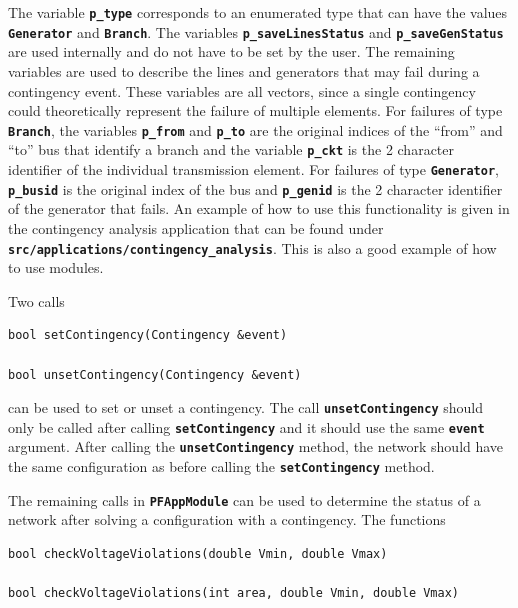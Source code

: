 \documentclass[12pt]{report} %
\begin{document}
The variable \texttt{\textbf{p\_type}} corresponds to an enumerated type that can have the values \texttt{\textbf{Generator}} and \texttt{\textbf{Branch}}. The variables \texttt{\textbf{p\_saveLinesStatus}} and \texttt{\textbf{p\_saveGenStatus}} are used internally and do not have to be set by the user. The remaining variables are used to describe the lines and generators that may fail during a contingency event. These variables are all vectors, since a single contingency could theoretically represent the failure of multiple elements. For failures of type \texttt{\textbf{Branch}}, the variables \texttt{\textbf{p\_from}} and \texttt{\textbf{p\_to}} are the original indices of the ``from'' and ``to'' bus that identify a branch and the variable \texttt{\textbf{p\_ckt}} is the 2 character identifier of the individual transmission element. For failures of type \texttt{\textbf{Generator}}, \texttt{\textbf{p\_busid}} is the original index of the bus and \texttt{\textbf{p\_genid}} is the 2 character identifier of the generator that fails. An example of how to use this functionality is given in the contingency analysis application that can be found under \texttt{\textbf{src/applications/contingency\_analysis}}. This is also a good example of how to use modules.

Two calls

{
\color{red}
\begin{Verbatim}[fontseries=b]
bool setContingency(Contingency &event)

bool unsetContingency(Contingency &event)
\end{Verbatim}
}

can be used to set or unset a contingency. The call \texttt{\textbf{unsetContingency}} should only be called after calling \texttt{\textbf{setContingency}} and it should use the same \texttt{\textbf{event}} argument. After calling the \texttt{\textbf{unsetContingency}} method, the network should have the same configuration as before calling the \texttt{\textbf{setContingency}} method.

The remaining calls in \texttt{\textbf{PFAppModule}} can be used to determine the status of a network after solving a configuration with a contingency. The functions

{
\color{red}
\begin{Verbatim}[fontseries=b]
bool checkVoltageViolations(double Vmin, double Vmax)

bool checkVoltageViolations(int area, double Vmin, double Vmax)
\end{Verbatim}
}
\end{document}
